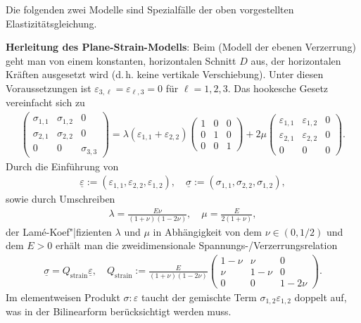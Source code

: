 Die folgenden zwei Modelle sind Spezialfälle der oben vorgestellten Elastizitätsgleichung.

\textbf{Herleitung des Plane-Strain-Modells}:
Beim  (Modell der ebenen Verzerrung)
geht man von einem konstanten, horizontalen Schnitt $D$ aus,
der horizontalen Kräften ausgesetzt wird (d.\,h. keine vertikale Verschiebung).
Unter diesen Voraussetzungen ist $\varepsilon_{3,\ell} = \varepsilon_{\ell,3} = 0$
für $\ell = 1, 2, 3$.
Das hookesche Gesetz vereinfacht sich zu
\begin{align*}
    \begin{pmatrix}\sigma_{1,1} & \sigma_{1,2} & 0\\\sigma_{2,1} & \sigma_{2,2} & 0\\
    0 & 0 & \sigma_{3,3}\end{pmatrix}
    = \lambda (\varepsilon_{1,1} + \varepsilon_{2,2})
    \begin{pmatrix}1&0&0\\0&1&0\\0&0&1\end{pmatrix} +
    2\mu \begin{pmatrix}\varepsilon_{1,1} & \varepsilon_{1,2} & 0\\
    \varepsilon_{2,1} & \varepsilon_{2,2} & 0\\0 & 0 & 0\end{pmatrix}.
\end{align*}
Durch die Einführung von
\begin{align*}
    \underline{\varepsilon} := (\varepsilon_{1,1}, \varepsilon_{2,2}, \varepsilon_{1,2}),\quad
    \underline{\sigma} := (\sigma_{1,1}, \sigma_{2,2}, \sigma_{1,2}),
\end{align*}
sowie durch Umschreiben
\begin{align*}
    \lambda = \frac{E\nu}{(1 + \nu)(1 - 2\nu)},\quad
    \mu = \frac{E}{2(1 + \nu)},
\end{align*}
der Lamé-Koef"|fizienten $\lambda$ und $\mu$
in Abhängigkeit von dem  $\nu \in (0, 1/2)$ und
dem  $E > 0$ erhält man
die zweidimensionale Spannungs-/Verzerrungsrelation
\begin{align*}
    \underline{\sigma} = Q_{\text{strain}} \underline{\varepsilon},\quad
    Q_{\text{strain}} := \frac{E}{(1 + \nu)(1 - 2\nu)}
    \begin{pmatrix}1 - \nu&\nu&0\\\nu&1 - \nu&0\\0&0&1-2\nu\end{pmatrix}.
\end{align*}
Im elementweisen Produkt $\sigma:\varepsilon$ taucht der gemischte Term
$\sigma_{1,2} \varepsilon_{1,2}$ doppelt auf, was in der Bilinearform berücksichtigt werden muss.

